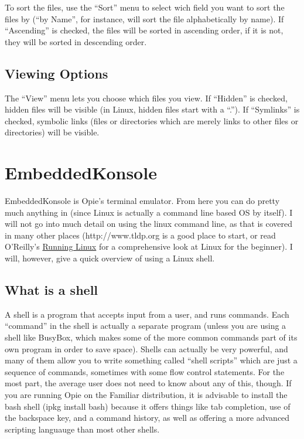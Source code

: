\documentclass[12pt,letterpaper,oneside, openany]{book} \usepackage[latin1] {inputenc}
\begin{document}
To sort the files, use the ``Sort'' menu to select wich field you want to sort the files by (``by Name'', for instance, will sort the file alphabetically by name). If ``Ascending'' is checked, the files will be sorted in ascending order, if it is not, they will be sorted in descending order. 

\section{Viewing Options}

The ``View'' menu lets you choose which files you view. If ``Hidden'' is checked, hidden files will be visible (in Linux, hidden files start with a ``.''). If ``Symlinks'' is checked, symbolic links (files or directories which are merely links to other files or directories) will be visible.

\chapter{EmbeddedKonsole}
EmbeddedKonsole is Opie's terminal emulator.  From here you can do pretty much anything in (since Linux is actually a command line based OS by itself).  I will not go into much detail on using the linux command line, as that is covered in many other places (http://www.tldp.org is a good place to start, or read O'Reilly's \underline{Running Linux} for a comprehensive look at Linux for the beginner).  I will, however, give a quick overview of using a Linux shell.

\section{What is a shell}

A shell is a program that accepts input from a user, and runs commands.  Each ``command'' in the shell is actually a separate program (unless you are using a shell like BusyBox, which makes some of the more common commands part of its own program in order to save space).  Shells can actually be very powerful, and many of them allow you to write something called ``shell scripts'' which are just a sequence of commands, sometimes with some flow control statements.  For the most part, the average user does not need to know about any of this, though.  If you are running Opie on the Familiar distribution, it is advisable to install the bash shell (ipkg install bash) because it offers things like tab completion, use of the backspace key, and a command history, as well as offering a more advanced scripting languauge than most other shells.
\end{document}
